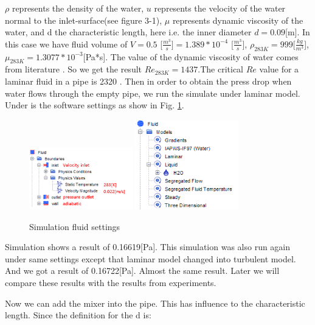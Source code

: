 \documentclass[journal,article,submit,moreauthors,pdftex]{Definitions/mdpi}
\begin{document}
$\rho$ represents the density of the water, $u$ represents the velocity of the water normal to the inlet-surface(see figure 3-1), $\mu$ represents dynamic viscosity of the water, and d the characteristic length, here i.e. the inner diameter $d=0.09$[m]. In this case we have fluid volume of $V = 0.5$ [$\frac{m^3}{s}]=1.389*10^{-4}$ [$\frac{m^3}{s}]$, $\rho_{283K}=999$[$\frac{kg}{m^3}$], $\mu_{283K}=1.3077*10^{-3}$[Pa*s]. The value of the dynamic viscosity of water comes from literature \cite{link-3}. So we get the result $Re_{283K}=1437$.The critical $Re$ value for a laminar fluid in a pipe is 2320 \cite{script}. Then in order to obtain the press drop when water flows through the empty pipe, we run the simulate under laminar model. Under is the software settings as show in Fig. \ref{fluid-settings}. 

\begin{figure}
\begin{center}
\centerline{\includegraphics[width=0.4\textwidth]{./docu_pictures/fluid.png} \includegraphics[width=0.4\textwidth]{./docu_pictures/fluid2.png}}
\end{center}
\caption{Simulation fluid settings}
\label{fluid-settings}
\end{figure}

Simulation shows a result of 0.16619[Pa]. This simulation was also run again under same settings except that laminar model changed into turbulent model. And we got a result of 0.16722[Pa]. Almost the same result. Later we will compare these results with the results from experiments. 

Now we can add the mixer into the pipe. This has influence to the characteristic length. Since the definition for the d is:
\end{document}
